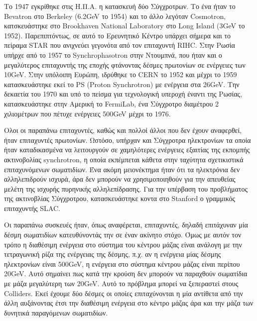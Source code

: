 Το 1947 εγκρίθηκε στις Η.Π.Α. η κατασκευή δύο Σύγχροτρων. Το ένα ήταν το Bevatron στο Berkeley (6.2GeV το 1954) και το άλλο λεγόταν Cosmotron, κατσκευάστηκε στο Brookhaven National Laboratory στο Long Island (3GeV το 1952). Παρεπιπτόντως, σε αυτό το Ερευνητικό Κέντρο υπάρχει σήμερα και το πείραμα STAR που ανιχνεύει γεγονότα από τον επιταχυντή RIHC. Στην Ρωσία υπήρχε από το 1957 το Synchrophasotron στην Ντουμπνά, που ήταν και ο μεγαλύτερος επιταχυντής της εποχής φτάνοντας δέσμες πρωτονίων σε ενέργειες των 10GeV. Στην υπόλοιπη Ευρώπη, ιδρύθηκε το CERN το 1952 και μέχρι το 1959 κατασκευάστηκε εκεί το PS (Proton Synchrotron) με ενέργεια στα 26GeV.
 	Την δεκαετία του 1970 και υπό το πείσμα για τεχνολογική υπεροχή έναντι της Ρωσίας, κατασκευάστηκε στην Αμερική το FermiLab, ένα Σύγχροτρο διαμέτρου 2 χιλιομέτρων που πέτυχε ενέργειες 500GeV μέχρι το 1976.
 	
	Ολοι οι παραπάνω επιταχυντές, καθώς και πολλοί άλλοι που δεν έχουν αναφερθεί, ήταν επιταχυντές πρωτονίων.
	 Ωστόσο, υπήρχαν και Σύγχροτρα ηλεκτρονίων τα οποία ήταν καταδικασμένα να λειτουργούν σε χαμηλότερες ενέργειες εξαιτίας της εκπομπής ακτινοβολίας synchrotron, η οποία εκπέμπεται κάθετα στην ταχύτητα σχετικιστικά επιταχυνόμενων σωματιδίων.
	Ένα ακόμη μειονέκτημα ήταν ότι τα ηλεκτρόνια δεν αλληλεπιδρούν ισχυρά, άρα δεν μπορούν να χρησιμοποιηθούν για την απευθείας μελέτη της ισχυρής πυρηνικής αλληλεπίδρασης.	Για την υπέρβαση του προβλήματος της ακτινοβλίας Σύγχροτρου, κατασκευάστηκε κοντα στο Stanford ο γραμμικός επιταχυντής SLAC.

Οι παραπάνω συσκευές ήταν, όπως αναφέρεται, επιταχυντές, δηλαδή επιτάχυναν μία δέσμη σωματιδίων κατευθύνοντάς την σε έναν ακίνητο στόχο. Όμως με αυτόν τον τρόπο η διαθέσιμη ενέργεια στο σύστημα του κέντρου μάζας είναι ανάλογη με την τετραγωνική ρίζα της ενέργειας της δέσμης, π.χ. αν η ενέργεια μίας δέσμης ηλεκτρονίων είναι 500GeV, η ενέργεια στο σύστημα κέντρου μάζας είναι περίπου 20GeV. Αυτό σημαίνει πως κατά την κρούση δεν μπορούν να παραχθούν σωματίδια με μάζα μεγαλύτερη των 20GeV. Αυτό το πρόβλημα μπορεί να ξεπεραστεί στους Colliders. Εκεί έχουμε δύο δέσμες οι οποίες επιταχύνονται η μία αντίθετα από την άλλη αυξάνοντας έτσι την διαθέσιμη ενέργεια στο κέντρο μάζας άρα και την μάζα των δυνητικά παραγόμενων σωματιδίων. 

